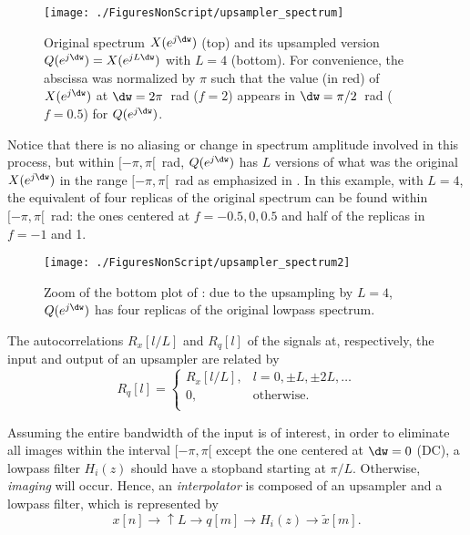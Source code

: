 \begin{figure}
\texttt{[image: ./FiguresNonScript/upsampler\_spectrum]}
\caption[Original spectrum $X(e^{j\dw})$ (top) and its upsampled version $Q(e^{j\dw}) = X(e^{jL\dw})$ with $L=4$ (bottom).]{Original spectrum $X(e^{j\dw})$ (top) and its upsampled version $Q(e^{j\dw}) = X(e^{jL\dw})$ with $L=4$ (bottom). For convenience, the abscissa was normalized by $\pi$ such 
that the value (in red) of $X(e^{j\dw})$ at $\dw=2\pi$~rad ($f=2$) appears in $\dw=\pi/2$~rad ($f=0.5$) for $Q(e^{j\dw})$.\label{fig:upsampler_spectrum}}
\end{figure}

Notice that there is no aliasing or change in spectrum amplitude involved in this process, but within $[-\pi,\pi[$~rad, $Q(e^{j\dw} )$ has $L$ versions of what was the original $X(e^{j\dw} )$ in the range $[-\pi,\pi[$~rad as emphasized
in . In this example, with $L=4$, the equivalent of four replicas of the original spectrum can be found within $[-\pi,\pi[$~rad: the ones centered at $f=-0.5,0,0.5$ and half of the replicas in $f=-1$ and 1.

\begin{figure}
\begin{center}
\texttt{[image: ./FiguresNonScript/upsampler\_spectrum2]}
\caption{Zoom of the bottom plot of : due to
the upsampling by $L=4$, $Q(e^{j\dw})$ has four replicas of the original lowpass spectrum.\label{fig:upsampler_spectrum2}}
\end{center}
\end{figure}


The autocorrelations $R_x[l/L]$ and $R_q[l]$ of the signals at, respectively, the input and output of an upsampler are related by
\begin{equation}
R_q[l]  = \left\{\begin{array}{cl} R_x[l/L],& l=0, \pm L, \pm 2L, \ldots\\ 0, & \text{otherwise.} \\ \end{array}\right. 
\label{eq:upsampledXcorr}
\end{equation}

Assuming the entire bandwidth of the input is of interest, in order to eliminate all images within the interval $[-\pi, \pi[$ except the one centered at $\dw = 0$ (DC), a lowpass filter $H_i(z)$ should have a stopband starting at $\pi/L$. Otherwise, \emph{imaging} will occur. 
Hence, an \emph{interpolator} is composed of an upsampler and a lowpass filter, which is represented by
\[
x[n] \rightarrow\boxed{\uparrow{L}}\rightarrow q[m] \rightarrow\boxed{H_i(z)}\rightarrow \tilde x[m].
\] 

